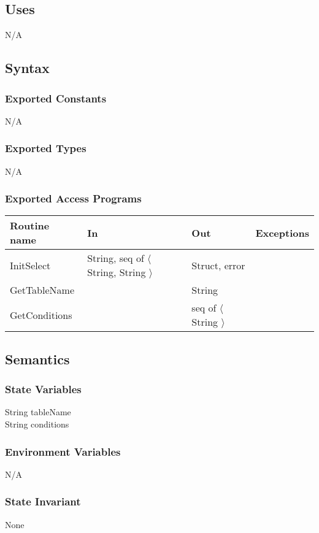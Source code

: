 \documentclass[12pt]{article}
\begin{document}
\subsection {Uses}
N/A

\subsection {Syntax}

\subsubsection {Exported Constants}
N/A
\subsubsection {Exported Types}
N/A

\subsubsection {Exported Access Programs}

\begin{tabular}{| l | l | l | l |}
\hline
\textbf{Routine name} & \textbf{In} & \textbf{Out} & \textbf{Exceptions}\\
\hline
InitSelect & String, seq of $\langle$ String, String $\rangle$  & Struct, error & \\
\hline
GetTableName & & String & \\
\hline
GetConditions & & seq of $\langle$ String $\rangle$ & \\
\hline
\end{tabular}

\subsection {Semantics}

\subsubsection {State Variables}
String tableName \\
String conditions \\

\subsubsection {Environment Variables}
N/A

\subsubsection {State Invariant}
None
\end{document}
